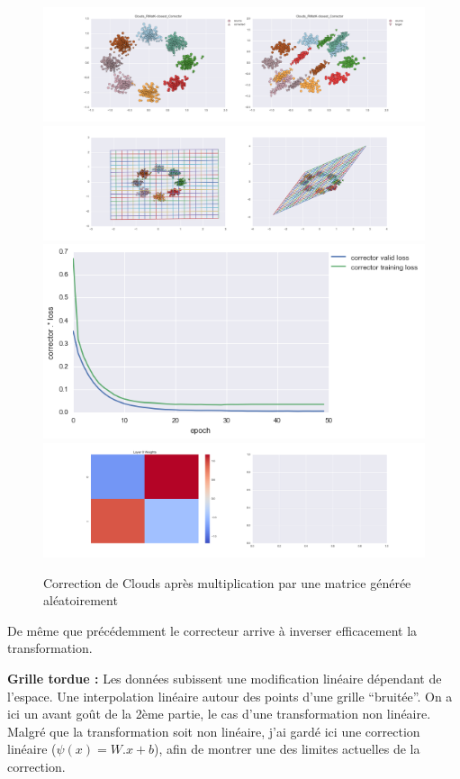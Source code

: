 \begin{figure}[H] %
\centering
\includegraphics[width=\linewidth]{fig/24-05-2016/clouds/Clouds_RMatK-closest_Corrector-DATA.png}
\includegraphics[width=\linewidth]{fig/24-05-2016/clouds/Clouds_RMatK-closest_Corrector-GridCheck.png}
\includegraphics[width=0.45\linewidth]{fig/24-05-2016/clouds/Clouds_RMatK-closest_Corrector-Learning_curve.png}
\includegraphics[width=\linewidth]{fig/24-05-2016/clouds/Clouds_RMatK-closest_Corrector-W.png}
\caption{Correction de Clouds après multiplication par une matrice générée aléatoirement}
\label{fig:recap-clouds-RMat-exhaustive}
\end{figure}

De même que précédemment le correcteur arrive à inverser efficacement la transformation.


{\Large \textbf{Grille tordue :}} Les données subissent une modification linéaire dépendant de l'espace.
Une interpolation linéaire autour des points d'une grille ``bruitée''.
On a ici un avant goût de la 2ème partie, le cas d'une transformation non linéaire.
Malgré que la transformation soit non linéaire, j'ai gardé ici une correction linéaire ($\psi(x) = W.x+b$),
afin de montrer une des limites actuelles de la correction.

